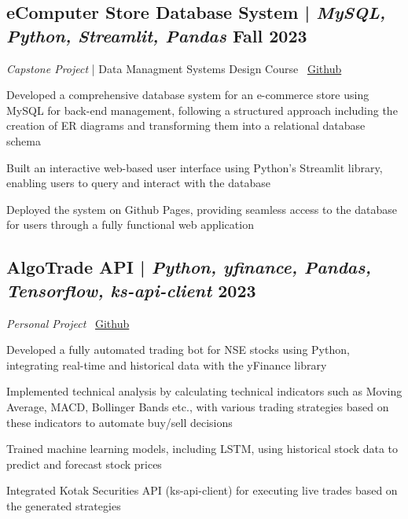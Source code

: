 \subsection{eComputer Store Database System \textnormal{ | \textit{MySQL, Python, Streamlit, Pandas} \hfill Fall 2023}}
\textit{Capstone Project} | Data Managment Systems Design Course \hfill \faCodeFork\ \href{https://github.com/vinay-ram1999/CS631-DMSD}{Github}
\begin{zitemize}
    \item Developed a comprehensive database system for an e-commerce store using MySQL for back-end management, following a structured approach including the creation of ER diagrams and transforming them into a relational database schema
    \item Built an interactive web-based user interface using Python's Streamlit library, enabling users to query and interact with the database
    \item Deployed the system on Github Pages, providing seamless access to the database for users through a fully functional web application
\end{zitemize}


\subsection{AlgoTrade API \textnormal{ | \textit{Python, yfinance, Pandas, Tensorflow, ks-api-client} \hfill 2023}}
\textit{Personal Project} \hfill \faCodeFork\ \href{https://github.com/vinay-ram1999/AlgoTrade-API}{Github}
\begin{zitemize}
    \item Developed a fully automated trading bot for NSE stocks using Python, integrating real-time and historical data with the yFinance library
    \item Implemented technical analysis by calculating technical indicators such as Moving Average, MACD, Bollinger Bands etc., with various trading strategies based on these indicators to automate buy/sell decisions
    \item Trained machine learning models, including LSTM, using historical stock data to predict and forecast stock prices
    \item Integrated Kotak Securities API (ks-api-client) for executing live trades based on the generated strategies
\end{zitemize}


